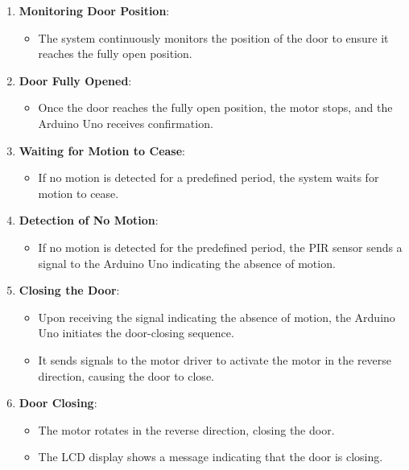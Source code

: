 \documentclass{article}
\begin{document}
\begin{enumerate}
    \item \textbf{Monitoring Door Position}:
        \begin{itemize}
            \item The system continuously monitors the position of the door to ensure it reaches the fully open position.
        \end{itemize}
        
    \item \textbf{Door Fully Opened}:
        \begin{itemize}
            \item Once the door reaches the fully open position, the motor stops, and the Arduino Uno receives confirmation.
        \end{itemize}
        
    \item \textbf{Waiting for Motion to Cease}:
        \begin{itemize}
            \item If no motion is detected for a predefined period, the system waits for motion to cease.
        \end{itemize}
        
    \item \textbf{Detection of No Motion}:
        \begin{itemize}
            \item If no motion is detected for the predefined period, the PIR sensor sends a signal to the Arduino Uno indicating the absence of motion.
        \end{itemize}
        
    \item \textbf{Closing the Door}:
        \begin{itemize}
            \item Upon receiving the signal indicating the absence of motion, the Arduino Uno initiates the door-closing sequence.
            \item It sends signals to the motor driver to activate the motor in the reverse direction, causing the door to close.
        \end{itemize}
        
    \item \textbf{Door Closing}:
        \begin{itemize}
            \item The motor rotates in the reverse direction, closing the door.
            \item The LCD display shows a message indicating that the door is closing.
        \end{itemize}
        

\end{enumerate}
\end{document}
